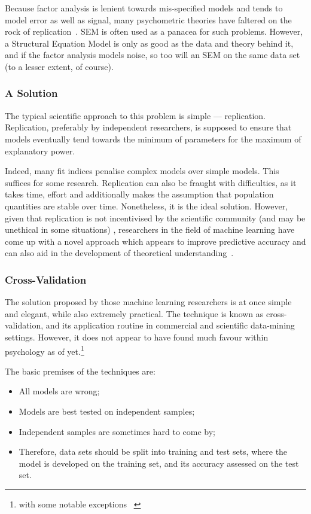 Because factor analysis is lenient towards mis-specified models and tends to model error as well as signal, many psychometric theories have faltered on the rock of replication~\cite{fabrigar1999evaluating}. SEM is often used as a panacea for such problems. However, a Structural Equation Model is only as good as the data and theory behind it, and if the factor analysis models noise, so too will an SEM on the same data set (to a lesser extent, of course). %

\subsubsection{A Solution}

The typical scientific approach to this problem is simple --- replication. Replication, preferably by independent researchers, is supposed to ensure that models eventually tend towards the minimum of parameters for the maximum of explanatory power.

Indeed, many fit indices penalise complex models over simple models. This suffices for some research. Replication can also be fraught with difficulties, as it takes time, effort and additionally makes the assumption that population quantities are stable over time. Nonetheless, it is the ideal solution. However, given that replication is not incentivised by the scientific community (and may be unethical in some situations) \cite{roediger2013psychology}, researchers in the field of machine learning have come up with a novel approach which appears to improve predictive accuracy and can also aid in the development of theoretical understanding~\cite{friedman2009elements}.

\subsubsection{Cross-Validation}

The solution proposed by those machine learning researchers is at once simple and elegant, while also extremely practical. The technique is known as cross-validation, and its application routine in commercial and scientific data-mining settings. However, it does not appear to have found much favour within psychology as of yet.\footnote{with some notable exceptions ~\cite{dawes1979robust}}

The basic premises of the techniques are:
\begin{itemize}
\item All models are wrong;
\item Models are best tested on independent samples;
\item Independent samples are sometimes hard to come by;
\item Therefore, data sets should be split into training and test sets, where the model is developed on the training set, and its accuracy assessed on the test set.
\end{itemize}


